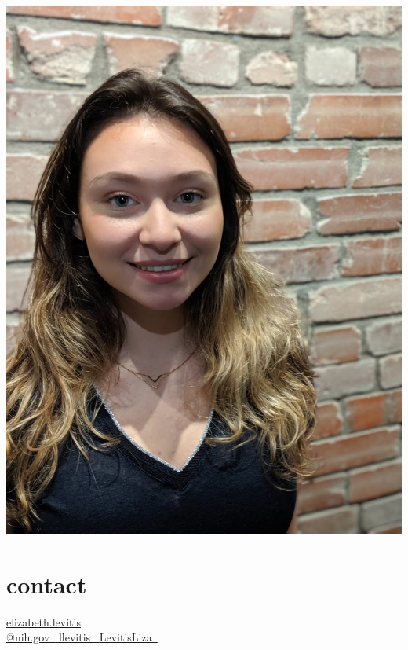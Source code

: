 \documentclass[]{friggeri-cv} %
\begin{document}


\begin{aside} %
 \includegraphics[width=\textwidth]{./llevitis_headshot.jpg}
\section{contact}
\href{mailto:elizabeth.levitis@mail.mcgill.ca}{elizabeth.levitis\\@nih.gov~{\color{red} \faEnvelope}}
\href{http://github.com/llevitis}{llevitis~{\color{purple} \faGithub}}
\href{https://twitter.com/LevitisLiza}{LevitisLiza~{\color{blue} \faTwitter}}%

\end{aside}
\end{document}
